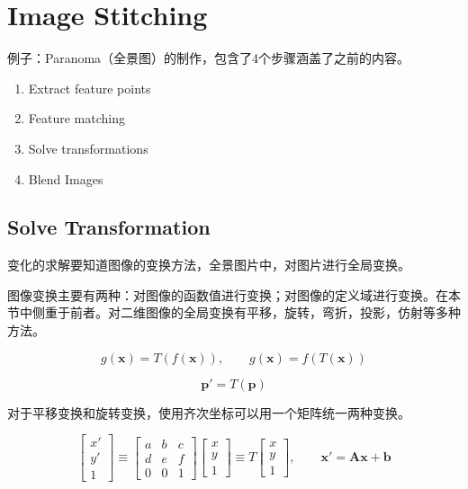 
\section{Image Stitching}

例子：Paranoma（全景图）的制作，包含了4个步骤涵盖了之前的内容。

\begin{enumerate}
    \item Extract feature points
    \item Feature matching
    \item Solve transformations
    \item Blend Images
\end{enumerate}

\subsection{Solve Transformation}

变化的求解要知道图像的变换方法，全景图片中，对图片进行全局变换。

图像变换主要有两种：对图像的函数值进行变换；对图像的定义域进行变换。在本节中侧重于前者。对二维图像的全局变换有平移，旋转，弯折，投影，仿射等多种方法。

\[
g(\boldsymbol{x}) = T(f(\boldsymbol{x})),
\qquad
g(\boldsymbol{x}) = f(T(\boldsymbol{x}))
\]

\[
\boldsymbol{p}' = T(\boldsymbol{p})
\]

对于平移变换和旋转变换，使用齐次坐标可以用一个矩阵统一两种变换。

\[
\begin{bmatrix} x' \\ y' \\ 1 \end{bmatrix}
\equiv
\begin{bmatrix} a & b & c \\ d & e & f \\ 0 & 0 & 1 \end{bmatrix}
\begin{bmatrix} x \\ y \\ 1 \end{bmatrix}
\equiv T \begin{bmatrix} x \\ y \\ 1 \end{bmatrix},
\qquad
\boldsymbol{x}' = \boldsymbol{A}\boldsymbol{x} + \boldsymbol{b}
\]

